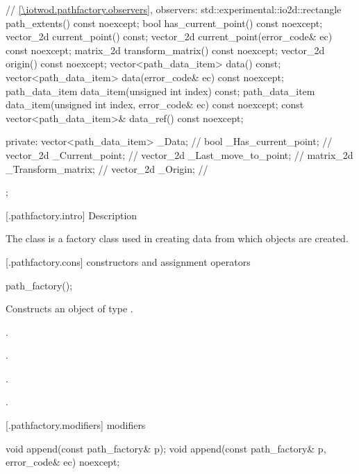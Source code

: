\begin{codeblock}
{{{{{    // \ref{\iotwod.pathfactory.observers}, observers:
    std::experimental::io2d::rectangle path_extents() const noexcept;
    bool has_current_point() const noexcept;
    vector_2d current_point() const;
    vector_2d current_point(error_code& ec) const noexcept;
    matrix_2d transform_matrix() const noexcept;
    vector_2d origin() const noexcept;
    vector<path_data_item> data() const;
    vector<path_data_item> data(error_code& ec) const noexcept;
    path_data_item data_item(unsigned int index) const;
    path_data_item data_item(unsigned int index, error_code& ec) const noexcept;
    const vector<path_data_item>& data_ref() const noexcept;

  private:
    vector<path_data_item> _Data;  // \expos
    bool _Has_current_point;       // \expos
    vector_2d _Current_point;      // \expos
    vector_2d _Last_move_to_point; // \expos
    matrix_2d _Transform_matrix;   // \expos
    vector_2d _Origin;             // \expos
  };
} } } }
\end{codeblock}

 [\iotwod.pathfactory.intro] { Description}

\pnum
{}
The  class is a factory class used in creating data from which  objects are created.

 [\iotwod.pathfactory.cons] { constructors and 
assignment operators}

\begin{itemdecl}
    path_factory();
\end{itemdecl}
\begin{itemdescr}
	\pnum
	\effects
	Constructs an object of type .
	
	\pnum
	\postconditions
	.
	
	\pnum
	.
	
	\pnum
	.
	
	\pnum
	.
	
\end{itemdescr}

 [\iotwod.pathfactory.modifiers] { modifiers}

\begin{itemdecl}
    void append(const path_factory& p);
    void append(const path_factory& p, error_code& ec) noexcept;
\end{itemdecl}
\begin{itemdescr}
	\pnum
	\postconditions
	
\end{itemdescr}

